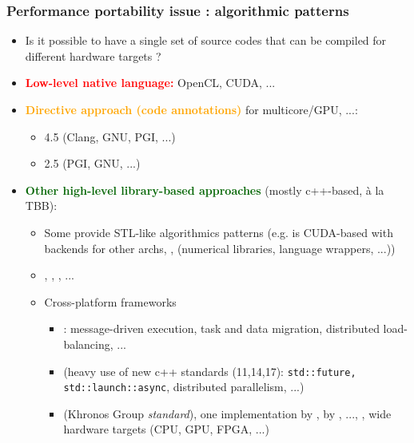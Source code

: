 \begin{frame}
  \frametitle{Performance portability issue : algorithmic patterns}

  \begin{itemize}
  \item Is it possible to have a single set of source codes that can be compiled for different hardware targets ?
  \item \textcolor{red}{\textbf{Low-level native language:}} OpenCL, CUDA, ...
  \item \textcolor{orange}{\textbf{Directive approach (code annotations)}} for multicore/GPU, ...: 
    \begin{itemize}
    \item {} 4.5 (Clang, GNU, PGI, ...)
    \item {} 2.5 (PGI, GNU, ...)
    \end{itemize}
  \item \textcolor{darkgreen}{\textbf{Other high-level library-based approaches}} (mostly c++-based, à la TBB):
    \begin{itemize}
    \item Some provide STL-like algorithmics patterns (e.g.  is CUDA-based with backends for other archs, ,  (numerical libraries, language wrappers, ...))
    \item {}, , , ...
    \item Cross-platform frameworks
      \begin{itemize}
      \item {}: message-driven execution, task and data migration, distributed load-balancing, ...
      \item {} (heavy use of new c++ standards (11,14,17): \texttt{std::future, std::launch::async}, distributed parallelism, ...)
      \item {} (Khronos Group \textit{standard}), one implementation by , by , ..., , wide hardware targets (CPU, GPU, FPGA, ...)

\end{itemize}
\end{itemize}
\end{itemize}
\end{frame}
